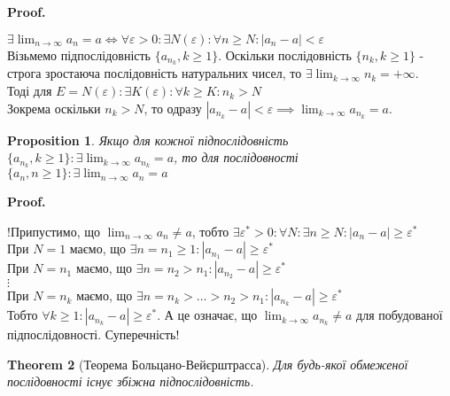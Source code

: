 \documentclass[a4paper, 14pt]{article}
\makeatletter
\def\huge{\displaystyle}
\def\qed{$\blacksquare$}
\theoremstyle{theoremdd}
\newtheorem{theorem}{Theorem}[subsection]
\theoremstyle{theoremdd}
\theoremstyle{theoremdd}
\theoremstyle{theoremdd}
\theoremstyle{theoremdd}
\newtheorem{proposition}[theorem]{Proposition}
\theoremstyle{theoremdd}
\theoremstyle{theoremdd}
\theoremstyle{theoremdd}
\renewenvironment{proof}[1][Proof.\\]{\par
\pushQED{\hfill \qed}%
\normalfont \topsep6\p@\@plus6\p@\relax
\trivlist
\item\relax
{\bfseries
#1\@addpunct{.}}\hspace\labelsep\ignorespaces
}{%
\popQED\endtrivlist\@endpefalse
}
\makeatother
\begin{document}
	\begin{proof}
	$\displaystyle \exists \lim_{n \to \infty} a_n = a \iff \forall \varepsilon > 0: \exists N(\varepsilon): \forall n \geq N: |a_n-a| < \varepsilon$\\
	Візьмемо підпослідовність $\{a_{n_k}, k \geq 1\}$. Оскільки послідовність $\{n_k, k \geq 1\}$ - строга зростаюча послідовність натуральних чисел, то $\exists \huge \lim_{k \to \infty} n_k = +\infty$.\\
	Тоді для $E = N(\varepsilon): \exists K(\varepsilon): \forall k \geq K: n_k > N$\\
	Зокрема оскільки $n_k > N$, то одразу $|a_{n_k} - a| < \varepsilon \implies \displaystyle \lim_{k \to \infty} a_{n_k} = a$.
	\end{proof}
	
	\begin{proposition}
	Якщо для кожної підпослідовність $\{a_{n_k}, k \geq 1\}: \exists \huge\lim_{k \to \infty} a_{n_k} = a$, то для послідовності $\{a_n, n \geq 1\}: \exists \huge\lim_{n \to \infty} a_n = a$
	\end{proposition}
	
	\begin{proof}
	!Припустимо, що $\huge\lim_{n \to \infty} a_n \neq a$, тобто $\exists \varepsilon^* > 0: \forall N: \exists n \geq N: |a_n-a| \geq \varepsilon^*$\\
	При $N = 1$ маємо, що $\exists n = n_1 \geq 1: |a_{n_1} - a| \geq \varepsilon^*$\\
	При $N = n_1$ маємо, що $\exists n = n_2 > n_1: |a_{n_2} - a| \geq \varepsilon^*$\\
	$\vdots$\\
	При $N = n_k$ маємо, що $\exists n = n_k > \dots > n_2 > n_1: |a_{n_k} - a| \geq \varepsilon^*$\\
	Тобто $\forall k \geq 1: |a_{n_k} - a| \geq \varepsilon^*$. А це означає, що $\huge\lim_{k \to \infty} a_{n_k} \neq a$ для побудованої підпослідовності. Суперечність!
	\end{proof}
	
	\begin{theorem}[Теорема Больцано-Вейєрштрасса]
	Для будь-якої обмеженої послідовності існує збіжна підпослідовність.
	\end{theorem}
	
\end{document}
